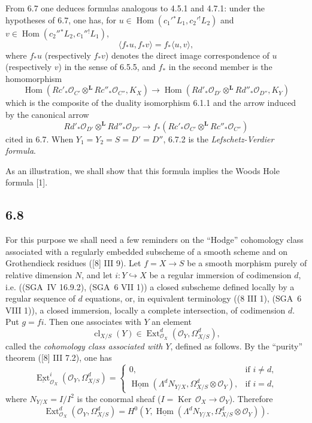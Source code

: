 \documentclass[11pt]{article}
\providecommand{\cO}{\mathcal{O}}
\providecommand{\uHom}{\underline{\Hom}}
\DeclareMathOperator{\Hom}{Hom}
\DeclareMathOperator{\Ext}{Ext}
\providecommand{\Ker}{\operatorname{Ker}}
\providecommand{\cl}{\operatorname{cl}}
\providecommand{\Hom}{\operatorname{Hom}}
\providecommand{\Ker}{\operatorname{Ker}}
\providecommand{\Ker}{\operatorname{Ker}}
\providecommand{\cl}{\operatorname{cl}}
\providecommand{\Hom}{\operatorname{Hom}}
\providecommand{\cl}{\operatorname{cl}}
\begin{document}
From 6.7 one deduces formulas analogous to 4.5.1 and 4.7.1: under the hypotheses of 6.7, one has, for $u\in\Hom(c_1'{}^*L_1,c_2'{}^!L_2)$ and $v\in\Hom(c_2''{}^*L_2,c_1''{}^!L_1)$,
\begin{equation}
\tag{6.7.2}
\langle f_*u,f_*v\rangle=f_*\langle u,v\rangle,
\end{equation}
where $f_*u$ (respectively $f_*v$) denotes the direct image correspondence of $u$ (respectively $v$) in the sense of 6.5.5, and $f_*$ in the second member is the homomorphism
\begin{equation}
\tag{6.7.3}
\Hom(Rc'_*\cO_{C'}\otimes^{\mathbf L}Rc''_*\cO_{C''},K_X)
\longrightarrow
\Hom(Rd'_*\cO_{D'}\otimes^{\mathbf L}Rd''_*\cO_{D''},K_Y)
\end{equation}
which is the composite of the duality isomorphism 6.1.1 and the arrow induced by the canonical arrow
\[
Rd'_*\cO_{D'}\otimes^{\mathbf L}Rd''_*\cO_{D''}\longrightarrow f_*(Rc'_*\cO_{C'}\otimes^{\mathbf L}Rc''_*\cO_{C''})
\]
cited in 6.7. When $Y_1=Y_2=S=D'=D''$, 6.7.2 is the \emph{Lefschetz-Verdier formula}.

As an illustration, we shall show that this formula implies the Woods Hole formula [1].

\subsection*{6.8}
For this purpose we shall need a few reminders on the ``Hodge'' cohomology class associated with a regularly embedded subscheme of a smooth scheme and on Grothendieck residues ([8] III 9). Let $f=X\to S$ be a smooth morphism purely of relative dimension $N$, and let $i:Y\hookrightarrow X$ be a regular immersion of codimension $d$, i.e. ((SGA~IV 16.9.2), (SGA~6 VII 1)) a closed subscheme defined locally by a regular sequence of $d$ equations, or, in equivalent terminology ((8 III 1), (SGA~6 VIII 1)), a closed immersion, locally a complete intersection, of codimension $d$. Put $g=fi$. Then one associates with $Y$ an element
\begin{equation}
\tag{6.8.1}
\cl_{X/S}(Y)\in\Ext^d_{\cO_X}(\cO_Y,\Omega^d_{X/S}),
\end{equation}
called the \emph{cohomology class associated with $Y$}, defined as follows. By the ``purity'' theorem ([8] III 7.2), one has
\begin{equation}
\tag{6.8.2}
\underline{\Ext}^i_{\cO_X}(\cO_Y,\Omega^d_{X/S})=
\begin{cases}
0,& \text{if } i\ne d,\\
\uHom(\Lambda^d N_{Y/X},\Omega^d_{X/S}\otimes\cO_Y),& \text{if } i=d,
\end{cases}
\end{equation}
where $N_{Y/X}=I/I^2$ is the conormal sheaf ($I=\Ker\,\cO_X\to\cO_Y$). Therefore
\begin{equation}
\tag{6.8.3}
\Ext^d_{\cO_X}(\cO_Y,\Omega^d_{X/S})=H^0(Y,\underline{\Hom}(\Lambda^dN_{Y/X},\Omega^d_{X/S}\otimes\cO_Y)).
\end{equation}
\end{document}
